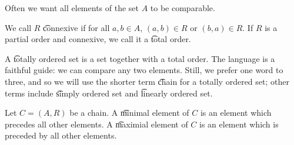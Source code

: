 

Often we want all elements of the set $A$ to be comparable.


We call $R$ \t{connexive} if for all $a, b \in A$, $(a, b) \in R$ or $(b, a) \in R$.
If $R$ is a partial order and connexive, we call it a \t{total order}.

A \t{totally ordered set} is a set together with a total order.
The language is a faithful guide: we can compare any two elements.
Still, we prefer one word to three, and so we will use the shorter term \t{chain} for a totally ordered set; other terms include \t{simply ordered set} and
\t{linearly ordered set}.

Let $C = (A, R)$ be a chain.
A \t{minimal element} of $C$ is an element which precedes all other elements.
A \t{maximial element} of $C$ is an element which is preceded by all other elements.

\blankpage
